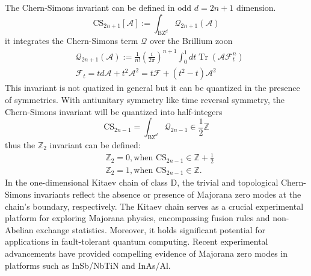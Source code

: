 The Chern-Simons invariant can be defined in odd $d = 2n+1$ dimension. 
\begin{equation}
    \mathrm{CS}_{2 n+1}[\mathcal{A}]:=\int_{\mathrm{BZ}^d} \mathcal{Q}_{2 n+1}(\mathcal{A})
\end{equation}
it integrates the Chern-Simons term $\mathcal{Q}$ over the Brillium zoon
\begin{align}
& \mathcal{Q}_{2 n+1}(\mathcal{A}):=\frac{1}{n !}\left(\frac{i}{2 \pi}\right)^{n+1} \int_0^1 d t \operatorname{Tr}\left(\mathcal{A} \mathcal{F}_t^n\right) \\
& \mathcal{F}_t=t d \mathcal{A}+t^2 \mathcal{A}^2=t \mathcal{F}+\left(t^2-t\right) \mathcal{A}^2
\end{align}
This invariant is not quatized in general but it can be quantized in the presence of symmetries. With antiunitary symmetry like time reversal symmetry, the  Chern-Simons invariant will be quantized into half-integers
\begin{equation}
\mathrm{CS}_{2 n-1}=\int_{\mathrm{BZ}^d} \mathcal{Q}_{2 n-1} \in \frac{1}{2} \mathbb{Z}
\end{equation}
thus the $\mathbb{Z}_2$ invariant can be defined:
\begin{align}
    &\mathbb{Z}_2 = 0, \text{when } \mathrm{CS}_{2n-1}\in \mathbb{Z} + \frac{1}{2} \\
    &\mathbb{Z}_2 = 1, \text{when } \mathrm{CS}_{2n-1}\in \mathbb{Z}.
\end{align}
In the one-dimensional Kitaev chain of class D\cite{kitaev2001unpaired}, the trivial and topological Chern-Simons invariants reflect the absence or presence of Majorana zero modes at the chain's boundary, respectively. The Kitaev chain serves as a crucial experimental platform for exploring Majorana physics, encompassing fusion rules and non-Abelian exchange statistics. Moreover, it holds significant potential for applications in fault-tolerant quantum computing. Recent experimental advancements have provided compelling evidence of Majorana zero modes in platforms such as InSb/NbTiN\cite{gul2018ballistic} and InAs/Al\cite{deng2016majorana}.

